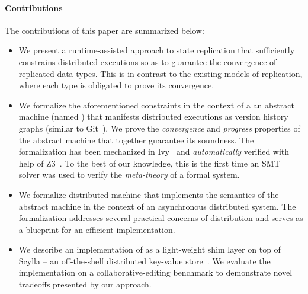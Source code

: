 
\paragraph{Contributions} The contributions of this paper are summarized
below:
\begin{itemize}
  \item We present a runtime-assisted approach to state replication
    that sufficiently constrains distributed executions so as to
    guarantee the convergence of replicated data types. This is in
    contrast to the existing models of replication, where each type is
    obligated to prove its convergence.

  \item We formalize the aforementioned constraints in the context of
    a an abstract machine (named \quark) that manifests distributed
    executions as version history graphs (similar to Git~\cite{git}).
    We prove the \emph{convergence} and \emph{progress} properties of
    the \quark abstract machine that together guarantee its soundness.
    The formalization has been mechanized in Ivy~\cite{ivy} and
    \emph{automatically} verified with help of Z3~\cite{z3}. To the
    best of our knowledge, this is the first time an SMT solver was
    used to verify the \emph{meta-theory} of a formal system.

  \item We formalize \quark distributed machine that implements the
    semantics of the \quark abstract machine in the context of an
    asynchronous distributed system. The formalization addresses
    several practical concerns of distribution and serves as a
    blueprint for an efficient implementation.

  \item We describe an implementation of \quark as a light-weight shim
    layer on top of Scylla -- an off-the-shelf distributed key-value
    store~\cite{scylla}. We evaluate the implementation on a
    collaborative-editing benchmark to demonstrate novel tradeoffs
    presented by our approach.
\end{itemize}

